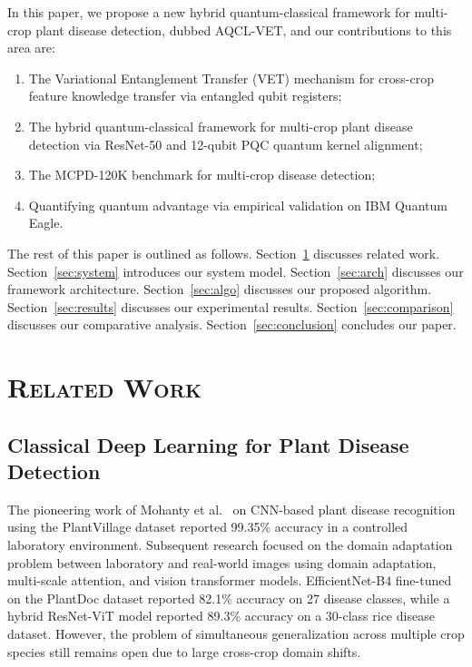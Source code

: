 \documentclass[conference]{IEEEtran}
\begin{document}
In this paper, we propose a new hybrid quantum-classical framework for multi-crop plant disease detection, dubbed AQCL-VET, and our contributions to this area are:
\begin{enumerate}
  \item The Variational Entanglement Transfer (VET) mechanism for cross-crop feature knowledge transfer via entangled qubit registers;
  \item The hybrid quantum-classical framework for multi-crop plant disease detection via ResNet-50 and 12-qubit PQC quantum kernel alignment;
  \item The MCPD-120K benchmark for multi-crop disease detection;
  \item Quantifying quantum advantage via empirical validation on IBM Quantum Eagle.
\end{enumerate}

The rest of this paper is outlined as follows. Section~\ref{sec:related} discusses related work. Section~\ref{sec:system} introduces our system model. Section~\ref{sec:arch} discusses our framework architecture. Section~\ref{sec:algo} discusses our proposed algorithm. Section~\ref{sec:results} discusses our experimental results. Section~\ref{sec:comparison} discusses our comparative analysis. Section~\ref{sec:conclusion} concludes our paper.

\section{\textsc{Related Work}}
\label{sec:related}

\subsection{Classical Deep Learning for Plant Disease Detection}

The pioneering work of Mohanty et al.~\cite{mohanty2016} on CNN-based plant disease recognition using the PlantVillage dataset reported 99.35\% accuracy in a controlled laboratory environment. Subsequent research focused on the domain adaptation problem between laboratory and real-world images using domain adaptation, multi-scale attention, and vision transformer models. EfficientNet-B4 fine-tuned on the PlantDoc dataset reported 82.1\% accuracy on 27 disease classes, while a hybrid ResNet-ViT model reported 89.3\% accuracy on a 30-class rice disease dataset. However, the problem of simultaneous generalization across multiple crop species still remains open due to large cross-crop domain shifts.
\end{document}
